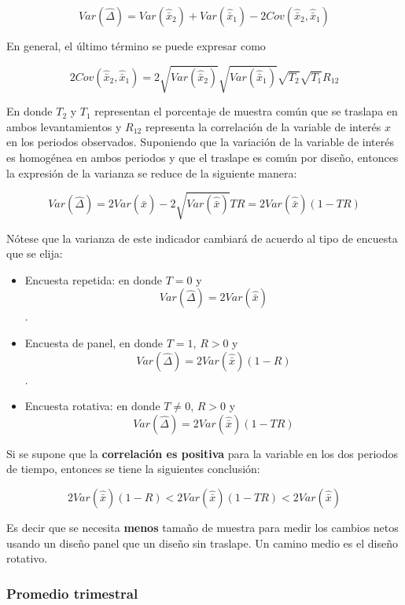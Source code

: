 \documentclass[
  10pt,
  spanish,
]{book}
\providecommand{\tightlist}{%
  \setlength{\itemsep}{0pt}\setlength{\parskip}{0pt}}
\begin{document}
\[
Var(\hat{\Delta}) = Var(\hat{\bar{x}}_2) + Var(\hat{\bar{x}}_1) - 2Cov(\hat{\bar{x}}_2, \hat{\bar{x}}_1)
\]

En general, el último término se puede expresar como

\[
2Cov(\hat{\bar{x}}_2, \hat{\bar{x}}_1) = 
2\sqrt{Var(\hat{\bar{x}}_2)}\sqrt{Var(\hat{\bar{x}}_1)}\sqrt{T_2}\sqrt{T_1}R_{12}
\]

En donde \(T_2\) y \(T_1\) representan el porcentaje de muestra común que se
traslapa en ambos levantamientos y \(R_{12}\) representa la correlación de
la variable de interés \(x\) en los periodos observados. Suponiendo que la
variación de la variable de interés es homogénea en ambos periodos y que
el traslape es común por diseño, entonces la expresión de la varianza se
reduce de la siguiente manera:

\[
Var(\hat{\Delta}) = 2Var(\hat{\bar{x}}) - 2\sqrt{Var(\hat{\bar{x}})}TR
=2Var(\hat{\bar{x}})(1-TR) 
\]

Nótese que la varianza de este indicador cambiará de acuerdo al tipo de
encuesta que se elija:

\begin{itemize}
\tightlist
\item
  Encuesta repetida: en donde \(T=0\) y
  \[Var(\hat{\Delta}) = 2Var(\hat{\bar{x}})\].
\item
  Encuesta de panel, en donde \(T=1\), \(R > 0\) y
  \[Var(\hat{\Delta}) = 2Var(\hat{\bar{x}})(1-R)\].
\item
  Encuesta rotativa: en donde \(T\neq 0\), \(R > 0\) y
  \[Var(\hat{\Delta}) = 2Var(\hat{\bar{x}})(1-TR)\]
\end{itemize}

Si se supone que la \textbf{correlación es positiva} para la variable en los
dos periodos de tiempo, entonces se tiene la siguientes conclusión:

\[
2Var(\hat{\bar{x}})(1-R) < 2Var(\hat{\bar{x}})(1-TR) < 2Var(\hat{\bar{x}})
\]

Es decir que se necesita \textbf{menos} tamaño de muestra para medir los
cambios netos usando un diseño panel que un diseño sin traslape. Un
camino medio es el diseño rotativo.

\hypertarget{promedio-trimestral}{%
\subsubsection*{Promedio trimestral}\label{promedio-trimestral}}
\end{document}
